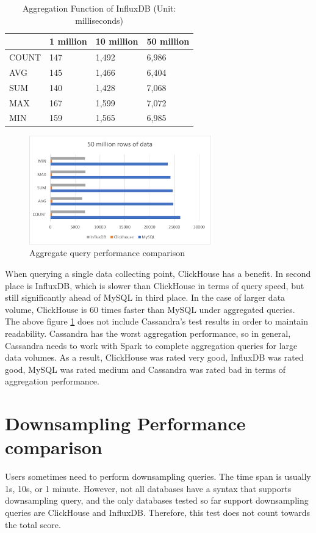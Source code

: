 \begin{table}[hbt!]
\centering
\begin{tabular}{@{}llll@{}}
\toprule
      & 1 million & 10 million & 50 million \\ \midrule
COUNT & 147       & 1,492       & 6,986       \\
AVG   & 145       & 1,466       & 6,404       \\
SUM   & 140       & 1,428       & 7,068       \\
MAX   & 167       & 1,599       & 7,072       \\
MIN   & 159       & 1,565       & 6,985       \\ \bottomrule
\end{tabular}
\caption{Aggregation Function of InfluxDB (Unit: milliseconds)}
\label{tab:agg_influx}
\end{table}


\begin{figure}[hbt!]
	\centering
 	\includegraphics[width=0.7\textwidth]{gfx/agg_query.png}
	\caption{Aggregate query performance comparison}
	\label{fig:agg_performance}
\end{figure}

When querying a single data collecting point, ClickHouse has a benefit. In second place is InfluxDB, which is slower than ClickHouse in terms of query speed, but still significantly ahead of MySQL in third place. In the case of larger data volume, ClickHouse is 60 times faster than MySQL under aggregated queries. The above figure \ref{fig:agg_performance} does not include Cassandra's test results in order to maintain readability. Cassandra has the worst aggregation performance, so in general, Cassandra needs to work with Spark to complete aggregation queries for large data volumes. As a result, ClickHouse was rated very good, InfluxDB was rated good, MySQL was rated medium and Cassandra was rated bad in terms of aggregation performance.

\section{Downsampling Performance comparison}
Users sometimes need to perform downsampling queries. The time span is usually 1s, 10s, or 1 minute. However, not all databases have a syntax that supports downsampling query, and the only databases tested so far support downsampling queries are ClickHouse and InfluxDB. Therefore, this test does not count towards the total score.


